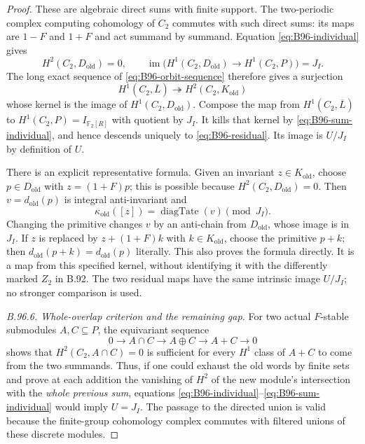 \begin{proof}
These are algebraic direct sums with finite support.  The
two-periodic complex computing cohomology of $C_2$ commutes
with such direct sums: its maps are $1-F$ and $1+F$ and act
summand by summand.  Equation \eqref{eq:B96-individual} gives
\[
 H^2(C_2,D_{\mathrm{old}})=0,
 \qquad
 \operatorname{im}\bigl(H^1(C_2,D_{\mathrm{old}})
                          \longrightarrow H^1(C_2,P)\bigr)=J_I.
\]
The long exact sequence of \eqref{eq:B96-orbit-sequence}
therefore gives a surjection
\begin{equation}\label{eq:B96-connecting}
 H^1(C_2,\overline L)\twoheadrightarrow
 H^2(C_2,K_{\mathrm{old}})
\end{equation}
whose kernel is the image of $H^1(C_2,D_{\mathrm{old}})$.
Compose the map from $H^1(C_2,\overline L)$ to
$H^1(C_2,P)=I_{\mathbb F_2[R]}$ with quotient by $J_I$.
It kills that kernel by \eqref{eq:B96-sum-individual}, and
hence descends uniquely to \eqref{eq:B96-residual}.  Its image
is $U/J_I$ by definition of $U$.

There is an explicit representative formula.  Given an invariant
$z\in K_{\mathrm{old}}$, choose $p\in D_{\mathrm{old}}$ with
$z=(1+F)p$; this is possible because
$H^2(C_2,D_{\mathrm{old}})=0$.  Then
$v=d_{\mathrm{old}}(p)$ is integral anti-invariant and
\begin{equation}\label{eq:B96-kappa-formula}
       \kappa_{\mathrm{old}}([z])=
              \operatorname{diagTate}(v)\pmod{J_I}.
\end{equation}
Changing the primitive changes $v$ by an anti-chain from
$D_{\mathrm{old}}$, whose image is in $J_I$.  If $z$ is replaced
by $z+(1+F)k$ with $k\in K_{\mathrm{old}}$, choose the primitive
$p+k$; then $d_{\mathrm{old}}(p+k)=d_{\mathrm{old}}(p)$ literally.
This also proves the formula directly.  It is
a map from this specified kernel, without identifying it with
the differently marked $Z_2$ in B.92.  The two residual maps
have the same intrinsic image $U/J_I$; no stronger comparison
is used.

\emph{B.96.6. Whole-overlap criterion and the remaining gap.}
For two actual $F$-stable submodules $A,C\subseteq P$, the
equivariant sequence
\[
 0\longrightarrow A\cap C\longrightarrow A\oplus C
     \longrightarrow A+C\longrightarrow0
\]
shows that $H^2(C_2,A\cap C)=0$ is sufficient for every $H^1$
class of $A+C$ to come from the two summands.  Thus, if one
could exhaust the old words by finite sets and prove at each
addition the vanishing of $H^2$ of the new module's intersection
with the \emph{whole previous sum}, equations
\eqref{eq:B96-individual}--\eqref{eq:B96-sum-individual}
would imply $U=J_I$.  The passage to the directed union is
valid because the finite-group cohomology complex commutes
with filtered unions of these discrete modules.


\end{proof}
